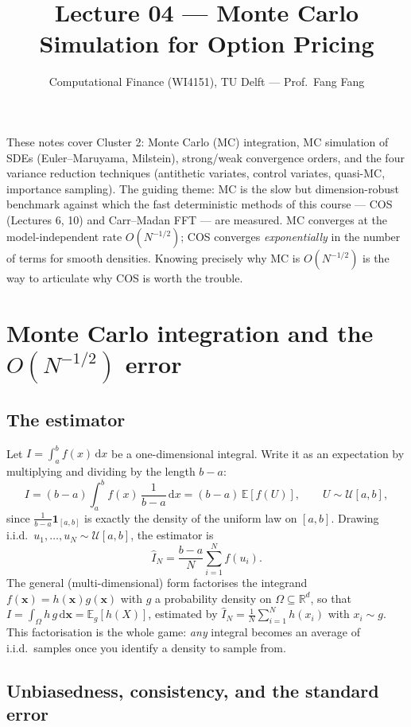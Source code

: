 \documentclass[11pt]{article}
\title{Lecture 04 --- Monte Carlo Simulation for Option Pricing}
\author{Computational Finance (WI4151), TU Delft --- Prof.\ Fang Fang}
\date{}
\newcommand{\R}{\mathbb{R}}
\newcommand{\E}{\mathbb{E}}
\newcommand{\dd}{\,\mathrm{d}}
\begin{document}
\maketitle

\noindent
These notes cover Cluster 2: Monte Carlo (MC) integration, MC simulation of SDEs
(Euler--Maruyama, Milstein), strong/weak convergence orders, and the four variance
reduction techniques (antithetic variates, control variates, quasi-MC, importance
sampling). The guiding theme: MC is the slow but dimension-robust benchmark against
which the fast deterministic methods of this course --- COS (Lectures 6, 10) and
Carr--Madan FFT --- are measured. MC converges at the model-independent rate
$O(N^{-1/2})$; COS converges \emph{exponentially} in the number of terms for smooth
densities. Knowing precisely why MC is $O(N^{-1/2})$ is the way to articulate why COS
is worth the trouble.

\tableofcontents

\section{Monte Carlo integration and the $O(N^{-1/2})$ error}

\subsection{The estimator}

Let $I=\int_a^b f(x)\dd x$ be a one-dimensional integral. Write it as an expectation by
multiplying and dividing by the length $b-a$:
\[
I=(b-a)\int_a^b f(x)\,\frac{1}{b-a}\dd x=(b-a)\,\E[f(U)],\qquad U\sim\mathcal U[a,b],
\]
since $\tfrac{1}{b-a}\mathbf 1_{[a,b]}$ is exactly the density of the uniform law on
$[a,b]$. Drawing i.i.d.\ $u_1,\dots,u_N\sim\mathcal U[a,b]$, the estimator is
\[
\widehat I_N=\frac{b-a}{N}\sum_{i=1}^N f(u_i).
\]
The general (multi-dimensional) form factorises the integrand $f(\mathbf x)=h(\mathbf
x)g(\mathbf x)$ with $g$ a probability density on $\Omega\subseteq\R^d$, so that
$I=\int_\Omega h\,g\dd\mathbf x=\E_g[h(X)]$, estimated by
$\widehat I_N=\frac1N\sum_{i=1}^N h(x_i)$ with $x_i\sim g$. This factorisation is the
whole game: \emph{any} integral becomes an average of i.i.d.\ samples once you identify
a density to sample from.

\subsection{Unbiasedness, consistency, and the standard error}
\end{document}
